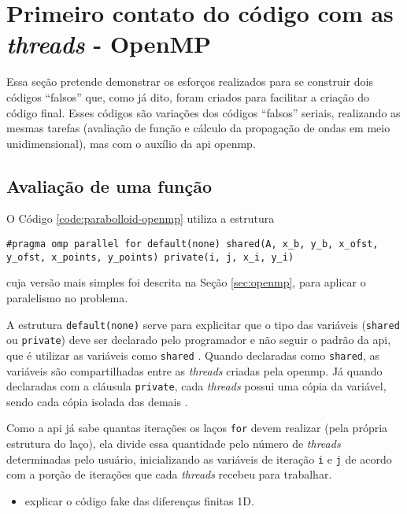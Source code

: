 \section{Primeiro contato do código com as \textit{threads} - OpenMP}

Essa seção pretende demonstrar os esforços realizados para se construir dois
códigos ``falsos'' que, como já dito, foram criados para facilitar a criação do código final.
Esses códigos são variações dos códigos ``falsos'' seriais, realizando as mesmas tarefas
(avaliação de função e cálculo da propagação de ondas em meio unidimensional), mas
com o auxílio da \gls{api} \acrshort{openmp}.

\subsection{Avaliação de uma função}

O Código \ref{code:parabolloid-openmp} utiliza a estrutura
\begin{lstlisting}
#pragma omp parallel for default(none) shared(A, x_b, y_b, x_ofst, y_ofst, x_points, y_points) private(i, j, x_i, y_i)
\end{lstlisting}
cuja versão mais simples foi descrita na Seção \ref{sec:openmp},  para aplicar o paralelismo no problema. 

A estrutura \texttt{default(none)} serve para explicitar que o tipo das variáveis (\texttt{shared} ou \texttt{private}) 
deve ser declarado pelo programador e não seguir o padrão da \acrshort{api}, que é utilizar as variáveis como \texttt{shared} 
\cite{unp:bosco-openmp-conceitos}. Quando declaradas como \texttt{shared}, as variáveis são compartilhadas entre 
as \textit{\gls{threads}} criadas pela \acrshort{openmp}. Já quando declaradas com a cláusula \texttt{private}, cada \textit{\gls{threads}} 
possui uma cópia da variável, sendo cada cópia isolada das demais \cite{unp:bosco-openmp-conceitos}.

Como a \acrshort{api} já sabe quantas iterações os laços \texttt{for} devem realizar (pela própria estrutura do laço), 
ela divide essa quantidade pelo número de \textit{\gls{threads}} determinadas pelo usuário, inicializando as variáveis 
de iteração \texttt{i} e \texttt{j} de acordo com a porção de iterações que cada \textit{\gls{threads}} recebeu para 
trabalhar.

\begin{itemize}
	\item explicar o código fake das diferenças finitas 1D.
\end{itemize}